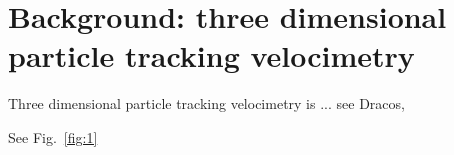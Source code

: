 \section{Background: three dimensional particle tracking velocimetry} 

Three dimensional particle tracking velocimetry is ... see Dracos, \cite{Dracos1996}
  
\cite{L_THI_2005} 

See Fig.~\ref{fig:1}
  